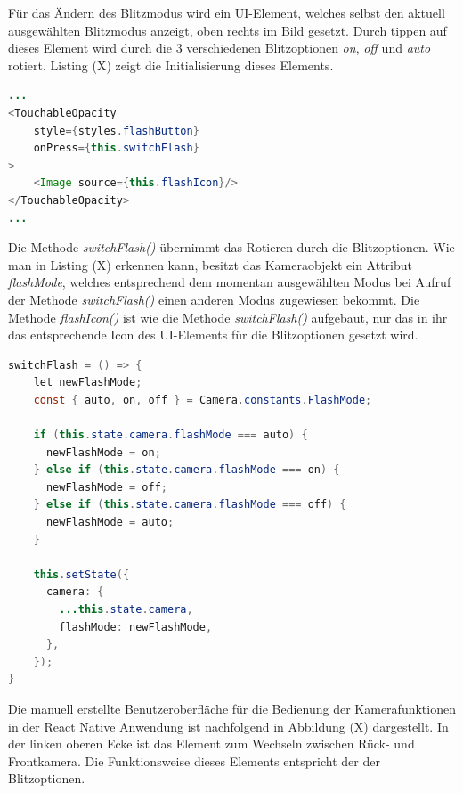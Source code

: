 Für das Ändern des Blitzmodus wird ein UI-Element, welches selbst den aktuell ausgewählten Blitzmodus anzeigt, oben rechts im Bild gesetzt. Durch tippen auf dieses Element wird durch die 3 verschiedenen Blitzoptionen \textit{on}, \textit{off} und \textit{auto} rotiert. Listing (X) zeigt die Initialisierung dieses Elements.  

\begin{lstlisting}[caption=Initialisierung des UI-Elements zum Wechseln des Blitzmodus, label=lst:FlashSwitchElement, language=Java]
...
<TouchableOpacity
	style={styles.flashButton}
    onPress={this.switchFlash}
>
    <Image source={this.flashIcon}/>
</TouchableOpacity>
...
\end{lstlisting}

Die Methode \textit{switchFlash()} übernimmt das Rotieren durch die Blitzoptionen. Wie man in Listing (X) erkennen kann, besitzt das Kameraobjekt ein Attribut \textit{flashMode}, welches entsprechend dem momentan ausgewählten Modus bei Aufruf der Methode \textit{switchFlash()} einen anderen Modus zugewiesen bekommt. Die Methode \textit{flashIcon()} ist wie die Methode \textit{switchFlash()} aufgebaut, nur das in ihr das entsprechende Icon des UI-Elements für die Blitzoptionen gesetzt wird.
\clearpage

\begin{lstlisting}[caption=Die Methode \textit{switchFlash()} für das Ändern des Blitzmodus, label=lst:switchFlash, language=Java]
switchFlash = () => {
    let newFlashMode;
    const { auto, on, off } = Camera.constants.FlashMode;

    if (this.state.camera.flashMode === auto) {
      newFlashMode = on;
    } else if (this.state.camera.flashMode === on) {
      newFlashMode = off;
    } else if (this.state.camera.flashMode === off) {
      newFlashMode = auto;
    }

    this.setState({
      camera: {
        ...this.state.camera,
        flashMode: newFlashMode,
      },
    });
}
\end{lstlisting}

Die manuell erstellte Benutzeroberfläche für die Bedienung der Kamerafunktionen in der React Native Anwendung ist nachfolgend in Abbildung (X) dargestellt. In der linken oberen Ecke ist das Element zum Wechseln zwischen Rück- und Frontkamera. Die Funktionsweise dieses Elements entspricht der der Blitzoptionen. 
\clearpage

